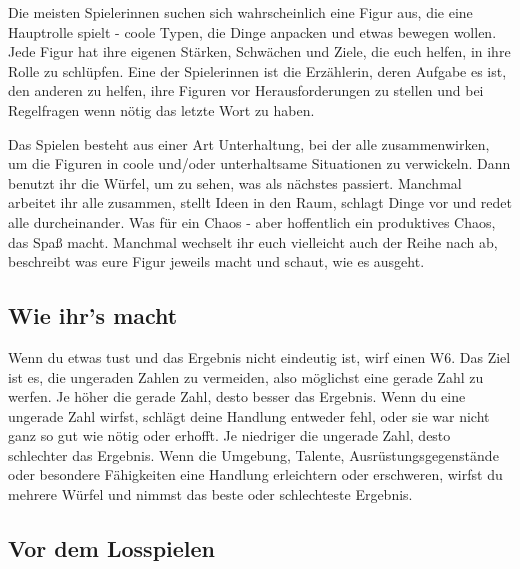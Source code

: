\begin{multicols}{2}
Die meisten Spielerinnen suchen sich wahrscheinlich eine Figur aus, die
eine Hauptrolle spielt - coole Typen, die Dinge anpacken und etwas
bewegen wollen. Jede Figur hat ihre eigenen Stärken, Schwächen und
Ziele, die euch helfen, in ihre Rolle zu schlüpfen. Eine der
Spielerinnen ist die Erzählerin, deren Aufgabe es ist, den anderen zu
helfen, ihre Figuren vor Herausforderungen zu stellen und bei
Regelfragen wenn nötig das letzte Wort zu haben.

Das Spielen besteht aus einer Art Unterhaltung, bei der alle
zusammenwirken, um die Figuren in coole und/oder unterhaltsame
Situationen zu verwickeln. Dann benutzt ihr die Würfel, um zu sehen, was
als nächstes passiert. Manchmal arbeitet ihr alle zusammen, stellt Ideen
in den Raum, schlagt Dinge vor und redet alle durcheinander. Was für ein
Chaos - aber hoffentlich ein produktives Chaos, das Spaß macht. Manchmal
wechselt ihr euch vielleicht auch der Reihe nach ab, beschreibt was eure
Figur jeweils macht und schaut, wie es ausgeht.

\newcommand{\TableResult}{%
	\tabelle{X c}{
		\thead{Wurf} & \thead{Ergebnis} \\
	}{
		6                   & Ja, und \\
		5         & Ja! \\
		4                   & Ja, aber \\
		3                &  Nein, aber \\
		2              & Nein! \\
		1 & Nein, und... \\
	}
}

\subsection{Wie ihr's macht}\label{wie-ihrs-macht}

Wenn du etwas tust und das Ergebnis nicht eindeutig ist, wirf einen W6.
Das Ziel ist es, die ungeraden Zahlen zu vermeiden, also möglichst eine
gerade Zahl zu werfen. Je höher die gerade Zahl, desto besser das
Ergebnis. Wenn du eine ungerade Zahl wirfst, schlägt deine Handlung
entweder fehl, oder sie war nicht ganz so gut wie nötig oder erhofft. Je
niedriger die ungerade Zahl, desto schlechter das Ergebnis. Wenn die
Umgebung, Talente, Ausrüstungsgegenstände oder besondere Fähigkeiten
eine Handlung erleichtern oder erschweren, wirfst du mehrere Würfel und
nimmst das beste oder schlechteste Ergebnis.

\subsection{Vor dem Losspielen}\label{vor-dem-losspielen}


\end{multicols}
